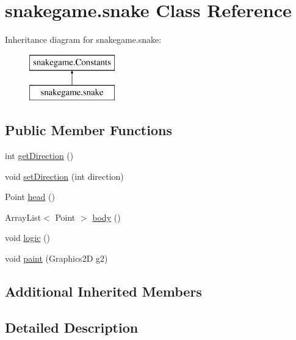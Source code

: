 \hypertarget{classsnakegame_1_1snake}{}\section{snakegame.\+snake Class Reference}
\label{classsnakegame_1_1snake}
Inheritance diagram for snakegame.\+snake\+:\begin{figure}[H]
\begin{center}
\leavevmode
\includegraphics[height=2.000000cm]{classsnakegame_1_1snake}
\end{center}
\end{figure}
\subsection*{Public Member Functions}
\begin{DoxyCompactItemize}
\item 
int \mbox{\hyperlink{classsnakegame_1_1snake_a488d8293668de46cd8daf048d26a2b55}{get\+Direction}} ()
\item 
void \mbox{\hyperlink{classsnakegame_1_1snake_ad2d7f86bae0fc94adde6c4417b4e1b8a}{set\+Direction}} (int direction)
\item 
Point \mbox{\hyperlink{classsnakegame_1_1snake_a1f9f29ffc498ba715fbb5419f35bc7fa}{head}} ()
\item 
Array\+List$<$ Point $>$ \mbox{\hyperlink{classsnakegame_1_1snake_a63cca0235c21cd483d69bb52e17d48cf}{body}} ()
\item 
void \mbox{\hyperlink{classsnakegame_1_1snake_a9372b56db6a2e802f5bb7e7fc1b244d5}{logic}} ()
\item 
void \mbox{\hyperlink{classsnakegame_1_1snake_a0997b6e2c2b622c3f4b013868c0165b1}{paint}} (Graphics2D g2)
\end{DoxyCompactItemize}
\subsection*{Additional Inherited Members}


\subsection{Detailed Description}


